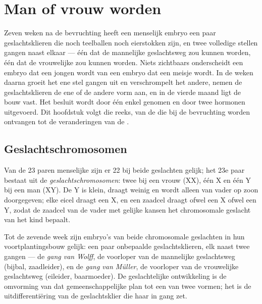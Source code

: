 \chapter{Man of vrouw worden}\label{ch:g11:becoming-male-female}

Zeven weken na de bevruchting heeft een menselijk embryo een paar
geslachtsklieren die noch teelballen noch eierstokken zijn, en twee
volledige stellen gangen naast elkaar --- één dat de mannelijke
geslachtsweg zou kunnen worden, één dat de vrouwelijke zou kunnen worden.
Niets zichtbaars onderscheidt een embryo dat een jongen wordt van een
embryo dat een meisje wordt. In de weken daarna groeit het ene stel
gangen uit en verschrompelt het andere, nemen de geslachtsklieren de ene
of de andere vorm aan, en in de vierde maand ligt de bouw vast. Het
besluit wordt door één enkel  genomen en door twee hormonen
uitgevoerd. Dit hoofdstuk volgt die reeks, van de  die bij de
bevruchting worden ontvangen tot de veranderingen van de .

\section{Geslachtschromosomen}

\begin{definition}[Geslachtschromosomen]\label{def:g11:becoming-male-female:chromosomes}
Van de 23 paren menselijke  zijn er 22 bij beide geslachten
gelijk; het 23e paar bestaat uit de
\emph{geslachtschromosomen}: twee
 bij een vrouw (XX), één X en één Y bij een man (XY). De Y
is klein, draagt weinig  en wordt alleen van vader op zoon
doorgegeven; elke eicel draagt een X, en een zaadcel draagt ofwel een X
ofwel een Y, zodat de zaadcel van de vader met gelijke kansen het
chromosomale geslacht van het kind bepaalt.
\end{definition}

\begin{proposition}\label{prop:g11:becoming-male-female:undifferentiated}
Tot de zevende week zijn embryo's van beide chromosomale geslachten in
hun voortplantingsbouw gelijk: een paar onbepaalde geslachtsklieren, elk
naast twee gangen --- de \emph{gang van Wolff}, de voorloper van de
mannelijke geslachtsweg (bijbal, zaadleider), en de \emph{gang van
Müller}, de voorloper van de vrouwelijke geslachtsweg (eileider,
baarmoeder). De geslachtelijke ontwikkeling is de omvorming van dat
gemeenschappelijke plan tot een van twee vormen; het is de
uitdifferentiëring van de geslachtsklier die haar in gang zet.
\end{proposition}
\admitted

